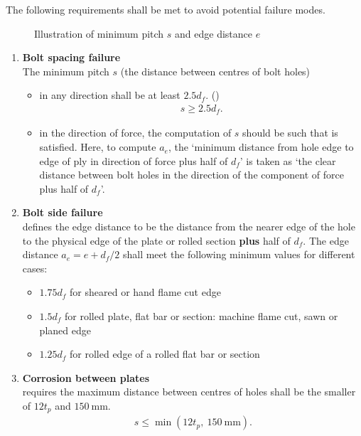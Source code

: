 The following requirements shall be met to avoid potential failure modes.
\begin{figure}[H]
\centering\caption{Illustration of minimum pitch $s$ and edge distance $e$}
\end{figure}
\begin{enumerate}
\item \textbf{Bolt spacing failure}\\
The minimum pitch $s$ (the distance between centres of bolt holes)
\begin{itemize}
\item in any direction shall be at least $2.5d_f$. ()
\begin{gather}
s\geqslant2.5d_f.
\end{gather}
\item in the direction of force, the computation of $s$ should be such that  is satisfied. Here, to compute $a_e$, the `minimum distance from hole edge to edge of ply in direction of force plus half of $d_f$' is taken as `the clear distance between bolt holes in the direction of the component of force plus half of $d_f$'.
\end{itemize}
\item \textbf{Bolt side failure}\\
 defines the edge distance to be the distance from the nearer edge of the hole to the physical edge of the plate or rolled section \textbf{plus} half of $d_f$. The edge distance $a_e=e+d_f/2$ shall meet the following minimum values for different cases:
\begin{itemize}
\item $1.75d_f$ for sheared or hand flame cut edge
\item $1.5d_f$ for rolled plate, flat bar or section: machine flame cut, sawn or planed edge
\item $1.25d_f$ for rolled edge of a rolled flat bar or section
\end{itemize}
\item \textbf{Corrosion between plates}\\
 requires the maximum distance between centres of holes shall be the smaller of $12t_p$ and $\SI{150}{\mm}$.
\begin{gather}
s\leqslant\min\left(12t_p,~\SI{150}{\mm}\right).
\end{gather}
\end{enumerate}
